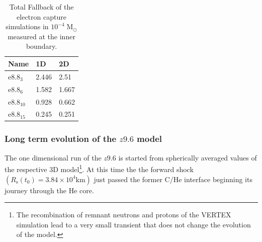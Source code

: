\documentclass[fleqn,usenatbib]{mnras}
\newcommand{\vertex}{\textsc{V{\footnotesize ERTEX}}\xspace}
\begin{document}
\begin{table}
  \begin{tabular}{l| l | l }
  Name & 1D & 2D \\
  \hline \hline
  $\mathrm{e}8.8_{3}$ & 2.446   &    2.51  \\
  $\mathrm{e}8.8_{6}$ & 1.582   &   1.667  \\
  $\mathrm{e}8.8_{10}$ & 0.928  &   0.662  \\
  $\mathrm{e}8.8_{15}$ & 0.245 &     0.251 \\
  \end{tabular}
    \caption{Total Fallback of the electron capture simulations in $\mathrm{10^{-4}\;M_{\odot}}$ measured at the inner boundary. }
    \label{table:long term overview}
\end{table}

\subsubsection{Long term evolution of the $z9.6$ model}
\label{subsec:z96 1d}
The one dimensional run of the $z9.6$ is started from spherically averaged values of the respective 3D model\footnote{The recombination of remnant neutrons and protons of the \vertex simulation lead to a very small transient that does not change the evolution of the model.}. At this time the the forward shock $(R_{\mathrm{s}}(t_0) = 3.84\times 10^4 \mathrm{km})$ just passed the former C/He interface beginning its journey through the He core.
\end{document}
